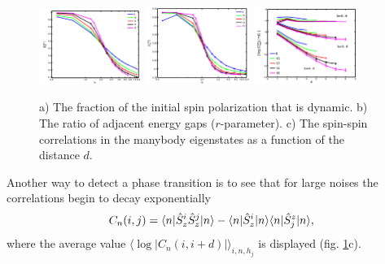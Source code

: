\begin{figure}[h]
    \centering
    \includegraphics[align=c, width=0.3\textwidth]{imgs/metrics.png}
    \includegraphics[align=c, width=0.3\textwidth]{imgs/metrics2.png}
    \includegraphics[align=c, width=0.3\textwidth]{imgs/metrics3.png}
    \caption{\cite{pal_many-body_2010} 
    a) The fraction of the initial spin polarization that is dynamic.
    b) The ratio of adjacent energy gaps ($r$-parameter).
    c) The spin-spin correlations in the manybody eigenstates as a function of the distance $d$.
    }
    \label{fig:metrics}
\end{figure}


Another way to detect a phase transition is to see that for large noises the correlations begin to decay exponentially
\begin{equation*}
C_n(i,j) = \bk{n}[\hat{S}^{i}_{z} \hat{S}^{j}_{z}]{n} - \bk{n}[ \hat{S}^{i}_{z} ]{n} \bk{n}[\hat{S}_j^z]{n},
\end{equation*}
where the average value $\langle \log |C_n(i,i+d)|\rangle_{i, n, h_j}$ is displayed (fig. \ref{fig:metrics}c).